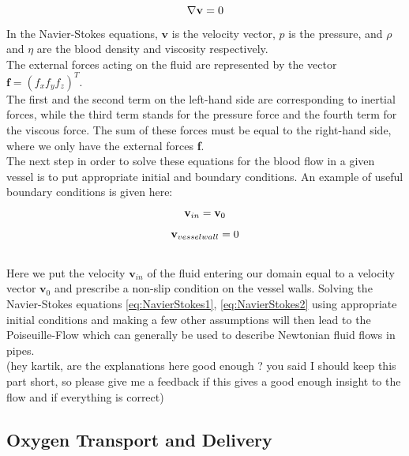 \begin{equation}
\\ \nabla \textbf{v} = 0
\label{eq:NavierStokes2}
\end{equation}
In the Navier-Stokes equations, $\textbf{v}$ is the velocity vector, $p$ is the pressure, and $\rho$ and $\eta$ are the blood density and viscosity respectively.
\\The external forces acting on the fluid are represented by the vector $\textbf{f} = (f_x f_y f_z)^T$.
\\The first and the second term on the left-hand side are corresponding to inertial forces, while the third term stands for the pressure force and the fourth term for the viscous force. The sum of these forces must be equal to the right-hand side, where we only have the external forces \textbf{f}.
\\The next step in order to solve these equations for the blood flow in a given vessel is to put appropriate initial and boundary conditions. An example of useful boundary conditions is given here:
\\\begin{equation}
\\ \textbf{v}_{in} =  \textbf{v}_0
\label{eq:Boundary1}
\end{equation}
\begin{equation}
\\ \textbf{v}_{vessel wall} =  0
\label{eq:Boundary2}
\end{equation}
\\Here we put the velocity $\textbf{v}_{in}$ of the fluid entering our domain equal to a velocity vector $\textbf{v}_0$ and prescribe a non-slip condition on the vessel walls. Solving the Navier-Stokes equations \ref{eq:NavierStokes1}, \ref{eq:NavierStokes2} using appropriate initial conditions and making a few other assumptions will then lead to the Poiseuille-Flow which can generally be used to describe Newtonian fluid flows in pipes.
\\ {\color{red} (hey kartik, are the explanations here good enough ? you said I should keep this part short, so please give me a feedback if this gives a good enough insight to the flow and if everything is correct)}

\newpage
\subsection{Oxygen Transport and Delivery}

